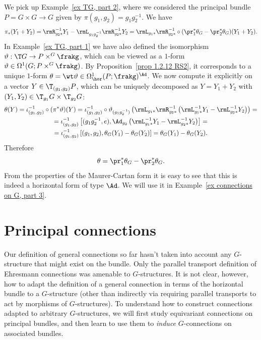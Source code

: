 \begin{example}\label{ex TG, part 3}
    We pick up Example~\ref{ex TG, part 2}, where we considered the principal bundle $P=G\times G\to G$ given by $\pi(g_1,g_2)=g_1g_2^{-1}$. We have 
    \[\pi_\ast(Y_1+Y_2)=\rmR_{g_2\ast}^{-1}Y_1-\rmL_{g_1g_2^{-1}}\rmR_{g_2\ast}^{-1}Y_2=\rmL_{g_1\ast}\rmR_{g_2\ast}^{-1}\circ(\pr_1^\ast\theta_G-\pr_2^\ast\theta_G)(Y_1+Y_2).\]
    In Example~\ref{ex TG, part 1} we have also defined the isomorphism $\vartheta:\T G\to P\times^G \frakg$, which can be viewed as a $1$-form $\vartheta\in\Omega^1(G;P\times^G \frakg)$. By Proposition~\ref{prop 1.2.12 RS2}, it corresponds to a unique $1$-form $\theta=\wt\vartheta\in\Omega^1_{\hor}(P;\frakg)^{\Ad}$. We now compute it explicitly on a vector $Y\in \T_{(g_1,g_2)}P$, which can be uniquely decomposed as $Y=Y_1+Y_2$ with $(Y_1,Y_2)\in \T_{g_1}G\times \T_{g_2}G$:
    \begin{multline}
        \theta(Y)=\iota_{(g_1,g_2)}^{-1}\circ (\pi^\ast\vartheta)(Y)=\iota_{(g_1,g_2)}^{-1}\circ\vartheta_{(g_1g_2^{-1})}\left(\rmL_{g_1\ast}\rmR_{g_2\ast}^{-1}\left(\rmL_{g_1\ast}^{-1}Y_1-\rmL_{g_2\ast}^{-1}Y_2\right)\right)=\\
        =\iota_{(g_1,g_2)}^{-1}\left[(g_1g_2^{-1},e),\Ad_{g_2}\left(\rmL_{g_1\ast}^{-1}Y_1-\rmL_{g_2\ast}^{-1}Y_2\right)\right]=\\
        =\iota_{(g_1,g_2)}^{-1}\left[(g_1,g_2),\theta_G(Y_1)-\theta_G(Y_2)\right]=\theta_G(Y_1)-\theta_G(Y_2).
    \end{multline}
    Therefore 
    \[\theta=\pr_1^\ast \theta_G-\pr_2^\ast\theta_G.\]
    From the properties of the Maurer-Cartan form it is easy to see that this is indeed a horizontal form of type $\Ad$. We will use it in Example~\ref{ex connections on G, part 3}.
\end{example}








\section{Principal connections}\label{sec principal connections}

Our definition of general connections so far hasn't taken into account any $G$-structure that might exist on the bundle. Only the parallel transport definition of Ehresmann connections was amenable to $G$-structures. It is not clear, however, how to adapt the definition of a general connection in terms of the horizontal bundle to a $G$-structure (other than indirectly via requiring parallel transports to act by morphisms of $G$-structures). To understand how to construct connections adapted to arbitrary $G$-structures, we will first study equivariant connections on principal bundles, and then learn to use them to \emph{induce} $G$-connections on associated bundles.

